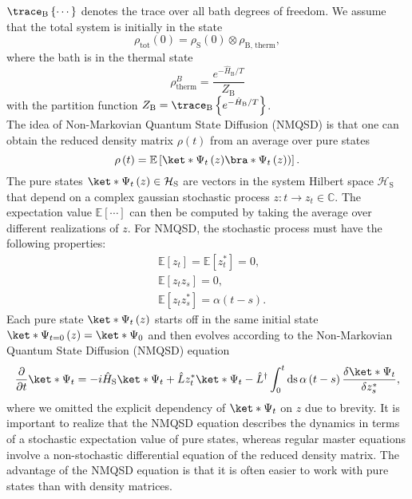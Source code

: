 $\trace_\text{B}\left\{\cdots\right\}$ denotes the trace over all bath degrees of freedom.
We assume that the total system is initially in the state
\begin{equation*}
    \rho_\text{tot}\left(0\right) = \rho_\text{S}\left(0\right) \otimes \rho_\text{B, therm},
\end{equation*}
where the bath is in the thermal state
\begin{equation*}
    \rho_\text{therm}^{B} = \frac{e^{-\hat{H}_\text{B} / T}}{Z_\text{B}}
\end{equation*}
with the partition function $Z_\text{B} = \trace_\text{B}\left\{e^{-\hat{H}_\text{B} / T}\right\}$.
\\
The idea of Non-Markovian Quantum State Diffusion (NMQSD) \cite{Diosi:1998,Diosi:1997,Strunz:1999,Percival:1999,Strunz:1996} is that one can obtain the reduced density matrix
$\rho\left(t\right)$ from an average over pure states
\begin{equation}
    \label{eq:averaging_states_linear}
    \rho\left(t\right) = \mathbb{E}\left[\ket*{\Psi_t\left(z\right)}\bra*{\Psi_t\left(z)\right)}\right].
\end{equation}
The pure states $\ket*{\Psi_t\left(z\right)} \in \mathcal{H}_\text{S}$ are vectors in the system
Hilbert space $\mathcal{H}_\text{S}$ that depend on a complex gaussian stochastic process $z \colon t \rightarrow z_t \in \mathbb{C}$.
The expectation value $\mathbb{E}\left[\cdots\right]$ can then be computed by taking the
average over different realizations of $z$. For NMQSD, the stochastic process must
have the following properties:
\begin{equation}
    \label{eq:stochastic_process_condition}
    \begin{aligned}
        & \mathbb{E}\left[z_{t}\right]=\mathbb{E}\left[z_{t}^*\right]=0,\\
        & \mathbb{E}\left[z_{t}z_{s}\right]=0,\\
        & \mathbb{E}\left[z_{t}z_{s}^*\right]=\alpha\left(t-s\right). 
    \end{aligned}
\end{equation}
Each pure state $\ket*{\Psi_t\left(z\right)}$ starts off in the same initial state
$\ket*{\Psi_{t=0}\left(z\right)}=\ket*{\Psi_0}$ and then evolves according
to the Non-Markovian Quantum State Diffusion (NMQSD) equation \cite{Diosi:1997,Diosi:1998}
\begin{equation}
    \label{eq:non_markovian_schroedinger_equation}
    \frac{\partial}{\partial t} \ket*{\Psi_t} = -i\hat{H}_\text{S} \ket*{\Psi_t}
    + \hat{L} z_{t}^* \ket*{\Psi_t}
    - \hat{L}^\dagger \int_0^t \text{ds} \, \alpha\left(t-s\right) 
    \frac{\delta \ket*{\Psi_t}}{\delta z_{s}^*},
\end{equation}
where we omitted the explicit dependency of $\ket*{\Psi_t}$ on $z$ due to brevity.
It is important to realize that the NMQSD equation describes the dynamics in terms of a stochastic
expectation value of pure states, whereas regular master equations involve a non-stochastic
differential equation of the reduced density matrix. The advantage of the NMQSD equation is that
it is often easier to work with pure states than with density matrices.
